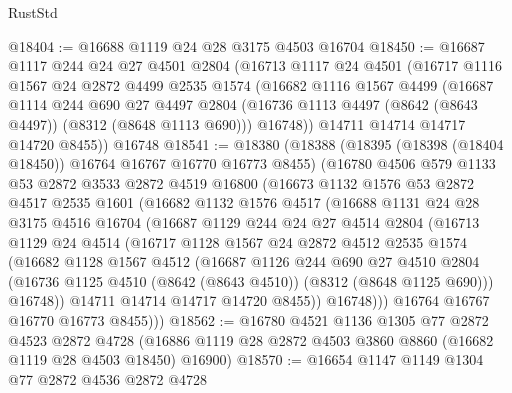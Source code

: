 \begin{lexlean}{RustStd}
\begin{coremodule}
@18404 := @16688 @1119 @24 @28 @3175 @4503 @16704
@18450 := @16687
    @1117
    @244
    @24
    @27
    @4501
    @2804
    (@16713
      @1117
      @24
      @4501
      (@16717
        @1116
        @1567
        @24
        @2872
        @4499
        @2535
        @1574
        (@16682
          @1116
          @1567
          @4499
          (@16687
            @1114
            @244
            @690
            @27
            @4497
            @2804
            (@16736 @1113 @4497 (@8642 (@8643 @4497)) (@8312 (@8648 @1113 @690)))
            @16748))
        @14711
        @14714
        @14717
        @14720
        @8455))
    @16748
@18541 := @18380
    (@18388
      (@18395 (@18398 (@18404 @18450)) @16764 @16767 @16770 @16773 @8455)
      (@16780
        @4506
        @579
        @1133
        @53
        @2872
        @3533
        @2872
        @4519
        @16800
        (@16673
          @1132
          @1576
          @53
          @2872
          @4517
          @2535
          @1601
          (@16682
            @1132
            @1576
            @4517
            (@16688
              @1131
              @24
              @28
              @3175
              @4516
              @16704
              (@16687
                @1129
                @244
                @24
                @27
                @4514
                @2804
                (@16713
                  @1129
                  @24
                  @4514
                  (@16717
                    @1128
                    @1567
                    @24
                    @2872
                    @4512
                    @2535
                    @1574
                    (@16682
                      @1128
                      @1567
                      @4512
                      (@16687
                        @1126
                        @244
                        @690
                        @27
                        @4510
                        @2804
                        (@16736 @1125 @4510 (@8642 (@8643 @4510)) (@8312 (@8648 @1125 @690)))
                        @16748))
                    @14711
                    @14714
                    @14717
                    @14720
                    @8455))
                @16748)))
          @16764
          @16767
          @16770
          @16773
          @8455)))
@18562 := @16780
    @4521
    @1136
    @1305
    @77
    @2872
    @4523
    @2872
    @4728
    (@16886 @1119 @28 @2872 @4503 @3860 @8860 (@16682 @1119 @28 @4503 @18450) @16900)
@18570 := @16654 @1147 @1149 @1304 @77 @2872 @4536 @2872 @4728

\end{coremodule}
\end{lexlean}

